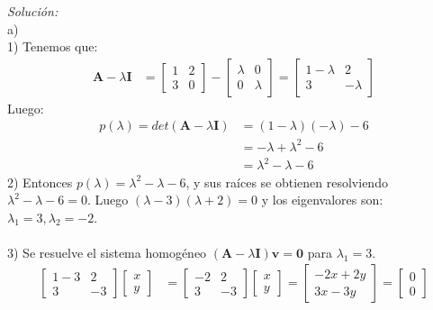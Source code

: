 \documentclass[12pt]{article}
\newenvironment{sol}
    {\emph{Solución:}
    }
    {
    }
\begin{document}
\begin{sol}\\
a)\\
1) Tenemos que:
\begin{align*}
\mathbf{A}-\lambda\mathbf{I} &= 
\begin{bmatrix}
1 & 2\\
3 & 0
\end{bmatrix}
-
\begin{bmatrix}
\lambda & 0 \\
0 & \lambda
\end{bmatrix}
=
\begin{bmatrix}
1-\lambda & 2 \\
3 & -\lambda
\end{bmatrix}
\end{align*}
Luego:
\begin{align*}
p(\lambda)=det(\mathbf{A}-\lambda\mathbf{I}) &= 
(1-\lambda)(-\lambda) -6  \\
&= -\lambda + \lambda^2 -6 \\
&= \lambda^2 - \lambda -6
\end{align*}
2) Entonces $p(\lambda)= \lambda^2 - \lambda -6$, y sus raíces se obtienen resolviendo $\lambda^2 - \lambda -6 = 0$. Luego $(\lambda-3)(\lambda+2)= 0$ y los eigenvalores son: $\lambda_1 = 3,\lambda_2=-2$.\\ \\
3) Se resuelve el sistema homogéneo $(\mathbf{A}-\lambda\mathbf{I})\mathbf{v}=\mathbf{0}$ para $\lambda_1=3$.
\begin{align*}
\begin{bmatrix}
1-3 & 2 \\
3 & -3
\end{bmatrix}
\begin{bmatrix}
x\\y
\end{bmatrix}
&= 
\begin{bmatrix}
-2 & 2 \\
3 & -3
\end{bmatrix}
\begin{bmatrix}
x\\y
\end{bmatrix} =
\begin{bmatrix}
-2x+2y\\3x-3y
\end{bmatrix}=
\begin{bmatrix}
0\\0
\end{bmatrix}
\end{align*}

\end{sol}
\end{document}
